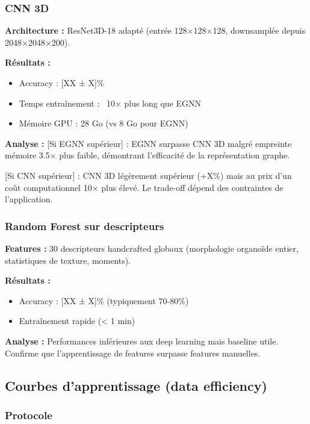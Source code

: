 \subsubsection{CNN 3D}

\textbf{Architecture :}
ResNet3D-18 adapté (entrée 128×128×128, downsamplée depuis 2048×2048×200).

\textbf{Résultats :}
\begin{itemize}
    \item Accuracy : [XX ± X]\%
    \item Temps entraînement : ~10× plus long que EGNN
    \item Mémoire GPU : 28 Go (vs 8 Go pour EGNN)
\end{itemize}

\textbf{Analyse :}
[Si EGNN supérieur] : EGNN surpasse CNN 3D malgré empreinte mémoire 3.5× plus faible, démontrant l'efficacité de la représentation graphe.

[Si CNN supérieur] : CNN 3D légèrement supérieur (+X\%) mais au prix d'un coût computationnel 10× plus élevé. Le trade-off dépend des contraintes de l'application.

\subsubsection{Random Forest sur descripteurs}

\textbf{Features :}
30 descripteurs handcrafted globaux (morphologie organoïde entier, statistiques de texture, moments).

\textbf{Résultats :}
\begin{itemize}
    \item Accuracy : [XX ± X]\% (typiquement 70-80\%)
    \item Entraînement rapide (< 1 min)
\end{itemize}

\textbf{Analyse :}
Performances inférieures aux deep learning mais baseline utile. Confirme que l'apprentissage de features surpasse features manuelles.

\subsection{Courbes d'apprentissage (data efficiency)}

\subsubsection{Protocole}

